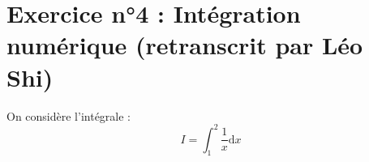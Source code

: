 \documentclass[a4paper]{article}
\def \de {{\rm d}}
\begin{document}
%

\section*{Exercice n°4 : Intégration numérique (retranscrit par Léo Shi)}

On considère l'intégrale : $$I = \int^2_1 \dfrac{1}{x}\text{d}x$$
\end{document}
